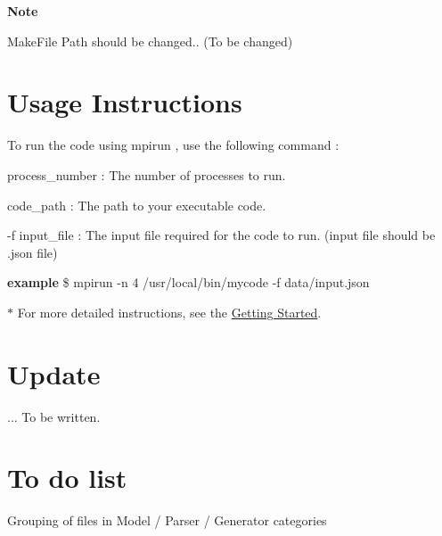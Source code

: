 {\bfseries Note} {\bfseries } 
\begin{DoxyItemize}
\item Make\-File Path should be changed.. (To be changed)
\end{DoxyItemize}\hypertarget{index_UsageInstructions}{}\section{Usage Instructions}\label{index_UsageInstructions}
To run the code using {\ttfamily  mpirun }, use the following command \-:





\begin{DoxyItemize}
\item process\-\_\-number \-: The number of processes to run.
\item code\-\_\-path \-: The path to your executable code.
\item -\/f input\-\_\-file \-: The input file required for the code to run. (input file should be {\ttfamily .json} file)
\end{DoxyItemize}

{\bfseries example} {\bfseries }  \$ mpirun -\/n 4 /usr/local/bin/mycode -\/f data/input.\-json 

{\bfseries $\ast$} For more detailed instructions, see the \hyperlink{GettingStarted}{Getting Started}.{\bfseries } \hypertarget{index_Update}{}\section{Update}\label{index_Update}
... To be written.\hypertarget{index_ToDoList}{}\section{To do list}\label{index_ToDoList}

\begin{DoxyItemize}
\item Grouping of files in Model / Parser / Generator categories 
\end{DoxyItemize}